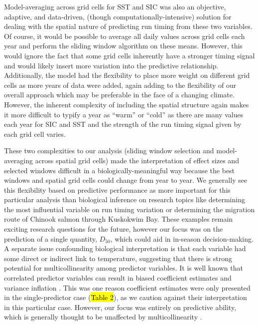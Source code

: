 \documentclass[12pt,]{book}
\theoremstyle{definition}
\theoremstyle{definition}
\theoremstyle{definition}
\theoremstyle{remark}
\begin{document}
Model-averaging across grid cells for SST and SIC was also an objective,
adaptive, and data-driven, (though computationally-intensive) solution
for dealing with the spatial nature of predicting run timing from these
two variables. Of course, it would be possible to average all daily
values across grid cells each year and perform the sliding window
algorithm on these means. However, this would ignore the fact that some
grid cells inherently have a stronger timing signal and would likely
insert more variation into the predictive relationship. Additionally,
the model had the flexibility to place more weight on different grid
cells as more years of data were added, again adding to the flexibility
of our overall approach which may be preferable in the face of a
changing climate. However, the inherent complexity of including the
spatial structure again makes it more difficult to typify a year as
``warm'' or ``cold'' as there are many values each year for SIC and SST
and the strength of the run timing signal given by each grid cell
varies.

These two complexities to our analysis (sliding window selection and
model-averaging across spatial grid cells) made the interpretation of
effect sizes and selected windows difficult in a biologically-meaningful
way because the best windows and spatial grid cells could change from
year to year. We generally see this flexibility based on predictive
performance as more important for this particular analysis than
biological inference on research topics like determining the most
influential variable on run timing variation or determining the
migration route of Chinook salmon through Kuskokwim Bay. These examples
remain exciting research questions for the future, however our focus was
on the prediction of a single quantity, \(D_{50}\), which could aid in
in-season decision-making. A separate issue confounding biological
interpretation is that each variable had some direct or indirect link to
temperature, suggesting that there is strong potential for
multicollinearity among predictor variables. It is well known that
correlated predictor variables can result in biased coefficient
estimates and variance inflation \citep{neter-etal-1996}. This was one
reason coefficient estimates were only presented in the single-predictor
case (\hl{Table 2}), as we caution against their interpretation in this
particular case. However, our focus was entirely on predictive ability,
which is generally thought to be unaffected by multicollinearity
\citep{graham-2003}.
\end{document}
